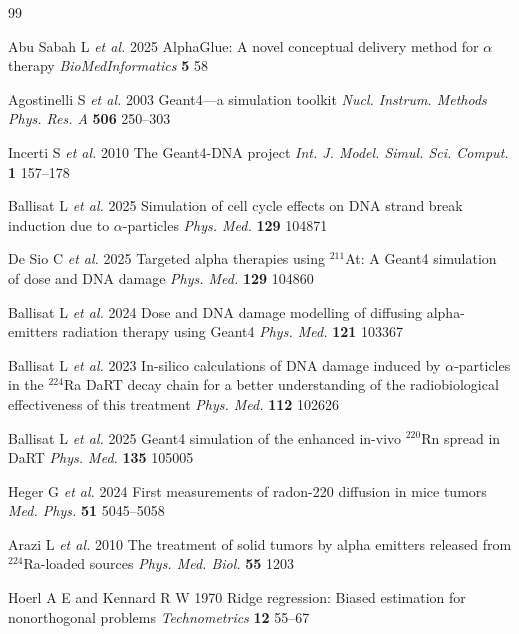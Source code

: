 \documentclass{iopconfser}
\begin{document}
\begin{thebibliography}{99}

Abu Sabah L \textit{et al.} 2025 AlphaGlue: A novel conceptual delivery method
for $\alpha$ therapy \textit{BioMedInformatics} \textbf{5} 58

Agostinelli S \textit{et al.} 2003 Geant4---a simulation toolkit
\textit{Nucl. Instrum. Methods Phys. Res. A} \textbf{506} 250--303

Incerti S \textit{et al.} 2010 The Geant4-DNA project
\textit{Int. J. Model. Simul. Sci. Comput.} \textbf{1} 157--178

Ballisat L \textit{et al.} 2025 Simulation of cell cycle effects on DNA strand
break induction due to $\alpha$-particles \textit{Phys. Med.} \textbf{129}
104871

De Sio C \textit{et al.} 2025 Targeted alpha therapies using $^{211}$At: A
Geant4 simulation of dose and DNA damage \textit{Phys. Med.} \textbf{129}
104860

Ballisat L \textit{et al.} 2024 Dose and DNA damage modelling of diffusing
alpha-emitters radiation therapy using Geant4 \textit{Phys. Med.} \textbf{121}
103367

Ballisat L \textit{et al.} 2023 In-silico calculations of DNA damage induced
by $\alpha$-particles in the $^{224}$Ra DaRT decay chain for a better
understanding of the radiobiological effectiveness of this treatment
\textit{Phys. Med.} \textbf{112} 102626

Ballisat L \textit{et al.} 2025 Geant4 simulation of the enhanced in-vivo
$^{220}$Rn spread in DaRT \textit{Phys. Med.} \textbf{135} 105005

Heger G \textit{et al.} 2024 First measurements of radon-220 diffusion in mice
tumors \textit{Med. Phys.} \textbf{51} 5045--5058

Arazi L \textit{et al.} 2010 The treatment of solid tumors by alpha emitters
released from $^{224}$Ra-loaded sources \textit{Phys. Med. Biol.} \textbf{55}
1203

Hoerl A E and Kennard R W 1970 Ridge regression: Biased estimation for
nonorthogonal problems \textit{Technometrics} \textbf{12} 55--67
\end{thebibliography}
\end{document}
